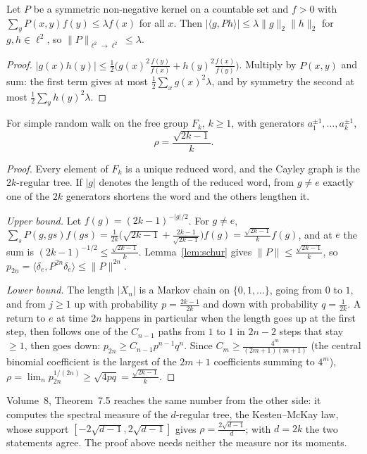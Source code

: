 \begin{lemma}\label{lem:schur}
Let $P$ be a symmetric non-negative kernel on a countable set and $f>0$ with $\sum_yP(x,y)f(y)\le\lambda f(x)$ for all $x$. Then $|\langle g,Ph\rangle|\le\lambda\|g\|_2\|h\|_2$ for $g,h\in\ell^2$, so $\|P\|_{\ell^2\to\ell^2}\le\lambda$.
\end{lemma}

\begin{proof}
$|g(x)h(y)|\le\frac12\bigl(g(x)^2\frac{f(y)}{f(x)}+h(y)^2\frac{f(x)}{f(y)}\bigr)$. Multiply by $P(x,y)$ and sum: the first term gives at most $\frac12\sum_xg(x)^2\lambda$, and by symmetry the second at most $\frac12\sum_yh(y)^2\lambda$.
\end{proof}

\begin{theorem}[Kesten, 1959]\label{thm:kesten}
For simple random walk on the free group $F_k$, $k\ge1$, with generators $a_1^{\pm1},\dots,a_k^{\pm1}$,
\[
\rho=\frac{\sqrt{2k-1}}k .
\]
\end{theorem}

\begin{proof}
Every element of $F_k$ is a unique reduced word, and the Cayley graph is the $2k$-regular tree. If $|g|$ denotes the length of the reduced word, from $g\ne e$ exactly one of the $2k$ generators shortens the word and the
others lengthen it.

\emph{Upper bound.} Let $f(g)=(2k-1)^{-|g|/2}$. For $g\ne e$, $\sum_sP(g,gs)f(gs)=\frac1{2k}\bigl(\sqrt{2k-1}+\frac{2k-1}{\sqrt{2k-1}}\bigr)f(g)=\frac{\sqrt{2k-1}}kf(g)$, and at $e$ the sum is $(2k-1)^{-1/2}\le\frac{\sqrt{2k-1}}k$. Lemma~\ref{lem:schur}
gives $\|P\|\le\frac{\sqrt{2k-1}}k$, so $p_{2n}=\langle\delta_e,P^{2n}\delta_e\rangle\le\|P\|^{2n}$.

\emph{Lower bound.} The length $|X_n|$ is a Markov chain on $\{0,1,\dots\}$, going from $0$ to $1$, and from $j\ge1$ up with probability $p=\frac{2k-1}{2k}$ and down with probability $q=\frac1{2k}$. A return to $e$ at time $2n$
happens in particular when the length goes up at the first step, then follows one of the $C_{n-1}$ paths from $1$ to $1$ in $2n-2$ steps that stay $\ge1$, then goes down: $p_{2n}\ge C_{n-1}p^{n-1}q^n$. Since
$C_m\ge\frac{4^m}{(2m+1)(m+1)}$ (the central binomial coefficient is the largest of the $2m+1$ coefficients summing to $4^m$), $\rho=\lim_np_{2n}^{1/(2n)}\ge\sqrt{4pq}=\frac{\sqrt{2k-1}}k$.
\end{proof}

Volume~8, Theorem~7.5 reaches the same number from the other side: it computes the spectral measure of the $d$-regular tree, the Kesten--McKay law, whose support $[-2\sqrt{d-1},2\sqrt{d-1}]$ gives $\rho=\frac{2\sqrt{d-1}}d$; with $d=2k$ the two statements agree. The proof above needs neither the measure nor its moments.

